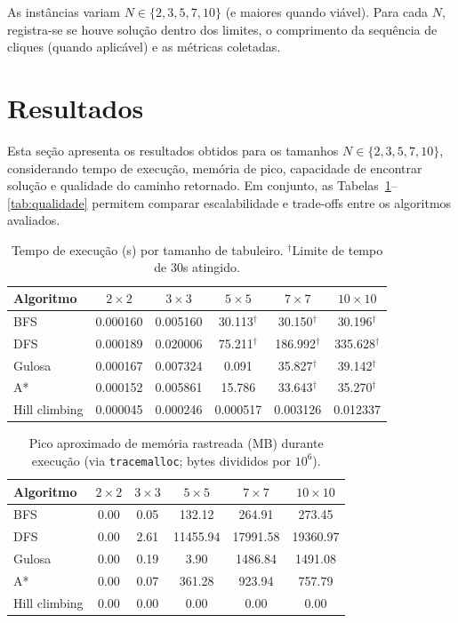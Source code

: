 \documentclass[12pt,a4paper]{article}
\begin{document}
As inst\^ancias variam $N \in \{2,3,5,7,10\}$ (e maiores quando vi\'avel). Para cada $N$, registra-se se houve solu\c{c}\~ao dentro dos limites, o comprimento da sequ\^encia de cliques (quando aplic\'avel) e as m\'etricas coletadas.

\section{Resultados}

Esta se\c{c}\~ao apresenta os resultados obtidos para os tamanhos $N \in \{2,3,5,7,10\}$, considerando tempo de execu\c{c}\~ao, mem\'oria de pico, capacidade de encontrar solu\c{c}\~ao e qualidade do caminho retornado. Em conjunto, as Tabelas~\ref{tab:tempo}--\ref{tab:qualidade} permitem comparar escalabilidade e trade-offs entre os algoritmos avaliados.

\begin{table}[H]
\centering
\begin{tabular}{lccccc}
\toprule
Algoritmo & $2\times 2$ & $3\times 3$ & $5\times 5$ & $7\times 7$ & $10\times 10$ \\
\midrule
BFS & 0.000160 & 0.005160 & 30.113$^{\dagger}$ & 30.150$^{\dagger}$ & 30.196$^{\dagger}$ \\
DFS & 0.000189 & 0.020006 & 75.211$^{\dagger}$ & 186.992$^{\dagger}$ & 335.628$^{\dagger}$ \\
Gulosa & 0.000167 & 0.007324 & 0.091 & 35.827$^{\dagger}$ & 39.142$^{\dagger}$ \\
A* & 0.000152 & 0.005861 & 15.786 & 33.643$^{\dagger}$ & 35.270$^{\dagger}$ \\
Hill climbing & 0.000045 & 0.000246 & 0.000517 & 0.003126 & 0.012337 \\
\bottomrule
\end{tabular}
\caption{Tempo de execu\c{c}\~ao (s) por tamanho de tabuleiro. $^{\dagger}$Limite de tempo de 30s atingido.}
\label{tab:tempo}
\end{table}

\begin{table}[H]
\centering
\begin{tabular}{lccccc}
\toprule
Algoritmo & $2\times 2$ & $3\times 3$ & $5\times 5$ & $7\times 7$ & $10\times 10$ \\
\midrule
BFS & 0.00 & 0.05 & 132.12 & 264.91 & 273.45 \\
DFS & 0.00 & 2.61 & 11455.94 & 17991.58 & 19360.97 \\
Gulosa & 0.00 & 0.19 & 3.90 & 1486.84 & 1491.08 \\
A* & 0.00 & 0.07 & 361.28 & 923.94 & 757.79 \\
Hill climbing & 0.00 & 0.00 & 0.00 & 0.00 & 0.00 \\
\bottomrule
\end{tabular}
\caption{Pico aproximado de mem\'oria rastreada (MB) durante execu\c{c}\~ao (via \texttt{tracemalloc}; bytes divididos por $10^6$).}
\label{tab:memoria}
\end{table}
\end{document}
